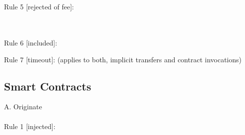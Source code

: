 \documentclass[a4paper]{llncs}
\begin{document}
~\\
~\\
Rule 5 [rejected of fee]:
\begin{mathpar}
\end{mathpar}
~\\
~\\
Rule 6 [included]:
\begin{mathpar}
\end{mathpar}
Rule 7 [timeout]: (applies to both, implicit transfers and contract invocations)
\begin{mathpar}
\end{mathpar}

\subsection{Smart Contracts}
A. Originate
~\\
~\\
Rule 1 [injected]:
\end{document}
